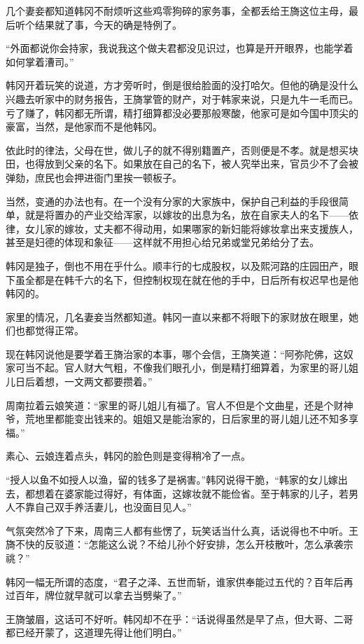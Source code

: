 几个妻妾都知道韩冈不耐烦听这些鸡零狗碎的家务事，全都丢给王旖这位主母，最后听个结果就了事，今天的确是特例了。

“外面都说你会持家，我说我这个做夫君都没见识过，也算是开开眼界，也能学着如何掌着漕司。”

韩冈开着玩笑的说道，方才旁听时，倒是很给脸面的没打哈欠。但他的确是没什么兴趣去听家中的财务报告，王旖掌管的财产，对于韩家来说，只是九牛一毛而已。亏了赚了，韩冈都无所谓，精打细算都没必要那般寒酸，他家可是如今国中顶尖的豪富，当然，是他家而不是他韩冈。

依此时的律法，父母在世，做儿子的就不得别籍置产，否则便是不孝。就是想买块田，也得放到父亲的名下。如果放在自己的名下，被人究举出来，官员少不了会被弹劾，庶民也会押进衙门里挨一顿板子。

当然，变通的办法也有。在一个没有分家的大家族中，保护自己利益的手段很简单，就是将置办的产业交给浑家，以嫁妆的出息为名，放在自家夫人的名下——依律，女儿家的嫁妆，丈夫都不得动用，如果哪家的新妇能将嫁妆拿出来支援族人，甚至是妇德的体现和象征——这样就不用担心给兄弟或堂兄弟给分了去。

韩冈是独子，倒也不用在乎什么。顺丰行的七成股权，以及熙河路的庄园田产，眼下虽全都是在韩千六的名下，但控制权现在就在他的手中，日后所有权迟早也是他韩冈的。

家里的情况，几名妻妾当然都知道。韩冈一直以来都不将眼下的家财放在眼里，她们也都觉得正常。

现在韩冈说他是要学着王旖治家的本事，哪个会信，王旖笑道：“阿弥陀佛，这奴家可当不起。官人财大气粗，不像我们眼孔小，倒是精打细算着，为家里的哥儿姐儿日后着想，一文两文都要攒着。”

周南拉着云娘笑道：“家里的哥儿姐儿有福了。官人不但是个文曲星，还是个财神爷，荒地里都能变出钱来的。姐姐又是能治家的，日后家里的哥儿姐儿还不知多享福。”

素心、云娘连着点头，韩冈的脸色则是变得稍冷了一点。

“授人以鱼不如授人以渔，留的钱多了是祸害。”韩冈说得干脆，“韩家的女儿嫁出去，都想着在婆家能过得好，有体面，这嫁妆就不能俭省。至于韩家的儿子，若男人不靠自己双手养活妻儿，也没面目见人。”

气氛突然冷了下来，周南三人都有些愣了，玩笑话当什么真，话说得也不中听。王旖不快的反驳道：“怎能这么说？不给儿孙个好安排，怎么开枝散叶，怎么承袭宗祧？”

韩冈一幅无所谓的态度，“君子之泽、五世而斩，谁家供奉能过五代的？百年后再过百年，牌位就早就可以拿去当劈柴了。”

王旖皱眉，这话可不好听。韩冈却不在乎：“话说得虽然是早了点，但大哥、二哥都已经开蒙了，这道理先得让他们明白。”

